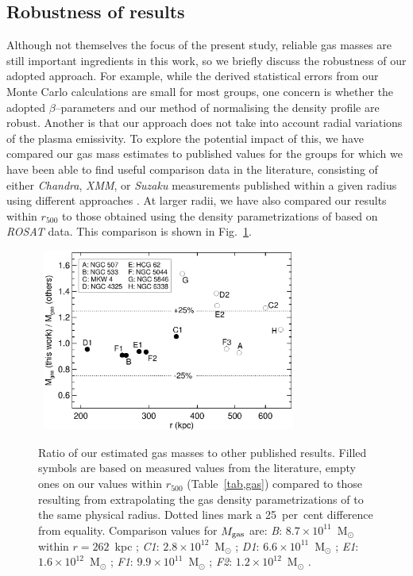 \documentclass[useAMS,usenatbib]{mn2e}
\begin{document}
\subsection{Robustness of results}\label{sec,comparison}

Although not themselves the focus of the present study, reliable gas
masses are still important ingredients in this work, so we briefly
discuss the robustness of our adopted approach. For example, while the
derived statistical errors from our Monte Carlo calculations are small
for most groups, one concern is whether the adopted
$\beta$--parameters and our method of normalising the density profile
are robust. Another is that our approach does not take into account
radial variations of the plasma emissivity. To explore the potential
impact of this, we have compared our gas mass estimates to published
values for the groups for which we have been able to find useful
comparison data in the literature, consisting of either {\em Chandra},
{\em XMM}, or {\em Suzaku} measurements published within a given
radius using different approaches \citep{mori06,gast07,komi09}. At
larger radii, we have also compared our results within $r_{500}$ to
those obtained using the density parametrizations of \citet{sand03}
based on {\em ROSAT} data. This comparison is shown in
Fig.~\ref{fig,compare}.
\begin{figure} 
\mbox{\hspace{-1mm} 
 \includegraphics[width=83mm]{fig3.eps}} 
\caption{Ratio of our estimated gas masses to other published
  results. Filled symbols are based on measured values from the
  literature, empty ones on our values within $r_{500}$
  (Table~\ref{tab,gas}) compared to those resulting from extrapolating
  the gas density parametrizations of \citet{sand03} to the same
  physical radius. Dotted lines mark a 25~per~cent difference from
  equality. Comparison values for $M_{\rm gas}$ are: {\em B}:
  $8.7\times 10^{11}$~M$_\odot$ within $r=262$~kpc \citep{gast07};
  {\em C1}: $2.8\times 10^{12}$~M$_\odot$ \citep[$r \le
  353$~kpc]{gast07}; {\em D1}: $6.6\times 10^{11}$~M$_\odot$ \citep[$r
  \le 208$~kpc]{gast07}; {\em E1}: $1.6\times 10^{12}$~M$_\odot$
  \citep[$r \le 283$~kpc]{mori06}; {\em F1}: $9.9\times
  10^{11}$~M$_\odot$ \citep[$r \le 256$~kpc]{komi09}; {\em F2}:
  $1.2\times 10^{12}$~M$_\odot$ \citep[$r \le 295$~kpc]{gast07}.}
\label{fig,compare} 
\end{figure} 
\end{document}
